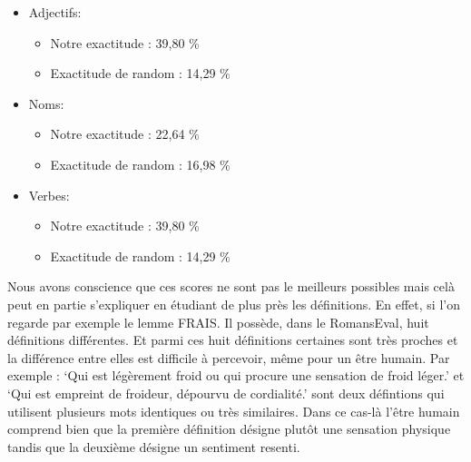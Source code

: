 \begin{itemize}
 \item {Adjectifs:
	\begin{itemize}
	 \item Notre exactitude : 39,80 \%
	 \item Exactitude de random : 14,29 \%
	\end{itemize}
	}
 \item {Noms:
 	\begin{itemize}
	 \item Notre exactitude : 22,64 \%
	 \item Exactitude de random : 16,98 \%
	\end{itemize}
	}
 \item {Verbes:
 	\begin{itemize}
	 \item Notre exactitude : 39,80 \%
	 \item Exactitude de random : 14,29 \%
	\end{itemize}
	}
\end{itemize}

Nous avons conscience que ces scores ne sont pas le meilleurs possibles mais 
celà peut en partie s'expliquer en étudiant de plus près les définitions. En 
effet, si l'on regarde par exemple le lemme FRAIS. Il possède, dans le 
RomansEval, huit définitions différentes. Et parmi ces huit définitions 
certaines sont très proches et la différence entre elles est difficile à 
percevoir, même pour un être humain. Par exemple : `Qui est légèrement froid ou 
qui procure une sensation de froid léger.' et `Qui est empreint de froideur, 
dépourvu de cordialité.' sont deux défintions qui utilisent plusieurs mots 
identiques ou très similaires. Dans ce cas-là l'être humain comprend bien que la 
première définition désigne plutôt une sensation physique tandis que la deuxième 
désigne un sentiment resenti.
